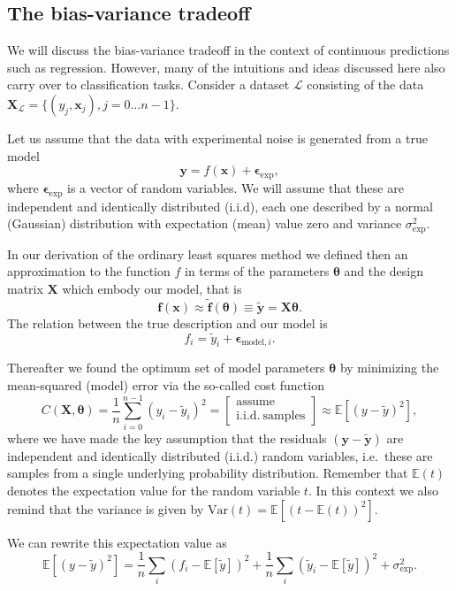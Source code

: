 \documentclass[%
oneside,                 %
final,                   %
10pt]{article}
\begin{document}
\subsection{The bias-variance tradeoff}

We will discuss the bias-variance tradeoff in the context of
continuous predictions such as regression. However, many of the
intuitions and ideas discussed here also carry over to classification
tasks. Consider a dataset $\mathcal{L}$ consisting of the data
$\mathbf{X}_\mathcal{L}=\{(y_j, \boldsymbol{x}_j), j=0\ldots n-1\}$. 

Let us assume that the data with experimental noise is generated from a true model
\[
\bm{y}=f(\boldsymbol{x}) + \bm{\epsilon}_\mathrm{exp},
\]
where $\bm{\epsilon}_\mathrm{exp}$ is a vector of random variables. We will assume that these are independent and identically distributed (i.i.d), each one described by a normal (Gaussian) distribution with expectation (mean) value zero and variance $\sigma^2_\mathrm{exp}$.

In our derivation of the ordinary least squares method we defined then
an approximation to the function $f$ in terms of the parameters
$\bm{\theta}$ and the design matrix $\bm{X}$ which embody our model,
that is 
\[
\bm{f}(\bm{x}) \approx \bm{\tilde{f}}(\bm{\theta}) \equiv \bm{\tilde{y}}=\bm{X}\bm{\theta}. 
\]
The relation between the true description and our model is
\[
f_i = \tilde{y}_i + \bm{\epsilon}_{\mathrm{model},i}.
\]

Thereafter we found the optimum set of model parameters $\bm{\theta}$ by minimizing the mean-squared (model) error via the so-called cost function
\[
C(\bm{X},\bm{\theta}) =\frac{1}{n}\sum_{i=0}^{n-1}(y_i-\tilde{y}_i)^2 = 
\left[ \begin{array}{c}
\mathrm{assume}\\
\mathrm{i.i.d.~samples}
\end{array} \right]
\approx
\mathbb{E}\left[(y-\tilde{y})^2\right],
\]
where we have made the key assumption that the residuals $(\bm{y}-\bm{\tilde{y}})$ are independent and identically distributed (i.i.d.) random variables, i.e.~these are samples from a single underlying probability distribution. Remember that $\mathbb{E}(t)$ denotes the expectation value for the random variable $t$. In this context we also remind that the variance is given by $\mathrm{Var}(t) = \mathbb{E} \left[ \left(t -  \mathbb{E}(t)\right)^2 \right]$.

We can rewrite this expectation value as 
\[
\mathbb{E}\left[(y-\tilde{y})^2\right]=\frac{1}{n}\sum_i(f_i-\mathbb{E}\left[\tilde{y}\right])^2+\frac{1}{n}\sum_i(\tilde{y}_i-\mathbb{E}\left[\tilde{y}\right])^2+\sigma^2_\mathrm{exp}.
\]
\end{document}
